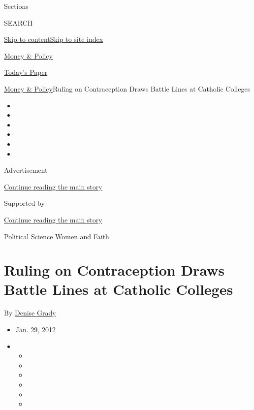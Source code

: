 Sections

SEARCH

\protect\hyperlink{site-content}{Skip to
content}\protect\hyperlink{site-index}{Skip to site index}

\href{https://www.nytimes3xbfgragh.onion/section/health/policy}{Money \&
Policy}

\href{https://myaccount.nytimes3xbfgragh.onion/auth/login?response_type=cookie\&client_id=vi}{}

\href{https://www.nytimes3xbfgragh.onion/section/todayspaper}{Today's
Paper}

\href{/section/health/policy}{Money \& Policy}\textbar{}Ruling on
Contraception Draws Battle Lines at Catholic Colleges

\begin{itemize}
\item
\item
\item
\item
\item
\item
\end{itemize}

Advertisement

\protect\hyperlink{after-top}{Continue reading the main story}

Supported by

\protect\hyperlink{after-sponsor}{Continue reading the main story}

Political Science \textbar{} Women and Faith

\hypertarget{ruling-on-contraception-draws-battle-lines-at-catholic-colleges}{%
\section{Ruling on Contraception Draws Battle Lines at Catholic
Colleges}\label{ruling-on-contraception-draws-battle-lines-at-catholic-colleges}}

By \href{https://www.nytimes3xbfgragh.onion/by/denise-grady}{Denise
Grady}

\begin{itemize}
\item
  Jan. 29, 2012
\item
  \begin{itemize}
  \item
  \item
  \item
  \item
  \item
  \item
  \end{itemize}
\end{itemize}

